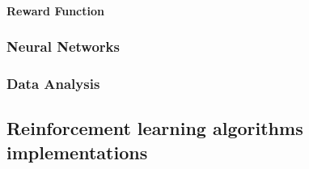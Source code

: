 \paragraph{Reward Function}

\subsubsection{Neural Networks}

\subsubsection{Data Analysis}

\subsection{Reinforcement learning algorithms implementations}




